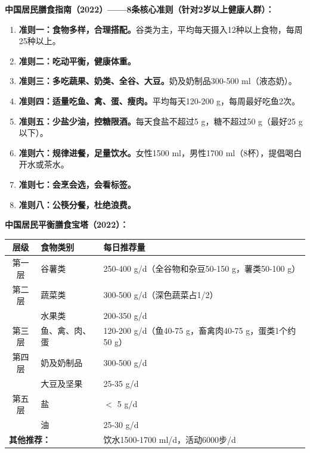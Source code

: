 \begin{keybox}
\textbf{中国居民膳食指南（2022）——8条核心准则（针对2岁以上健康人群）：}

\begin{enumerate}[leftmargin=*]
    \item \textbf{准则一：食物多样，合理搭配。}谷类为主，平均每天摄入12种以上食物，每周25种以上。
    \item \textbf{准则二：吃动平衡，健康体重。}
    \item \textbf{准则三：多吃蔬果、奶类、全谷、大豆。}奶及奶制品300-500 ml（液态奶）。
    \item \textbf{准则四：适量吃鱼、禽、蛋、瘦肉。}平均每天120-200 g，每周最好吃鱼2次。
    \item \textbf{准则五：少盐少油，控糖限酒。}每天食盐不超过5 g，糖不超过50 g（最好25 g以下）。
    \item \textbf{准则六：规律进餐，足量饮水。}女性1500 ml，男性1700 ml（8杯），提倡喝白开水或茶水。
    \item \textbf{准则七：会烹会选，会看标签。}
    \item \textbf{准则八：公筷分餐，杜绝浪费。}
\end{enumerate}
\end{keybox}

\begin{keybox}
\textbf{中国居民平衡膳食宝塔（2022）：}

\begin{table}[H]
\centering
\begin{tabularx}{\textwidth}{clX}
\toprule
\textbf{层级} & \textbf{食物类别} & \textbf{每日推荐量} \\
\midrule
第一层 & 谷薯类 & 250-400 g/d（全谷物和杂豆50-150 g，薯类50-100 g） \\
\midrule
第二层 & 蔬菜类 & 300-500 g/d（深色蔬菜占1/2） \\
       & 水果类 & 200-350 g/d \\
\midrule
第三层 & 鱼、禽、肉、蛋 & 120-200 g/d（鱼40-75 g，畜禽肉40-75 g，蛋类1个约50 g） \\
\midrule
第四层 & 奶及奶制品 & 300-500 g/d \\
       & 大豆及坚果 & 25-35 g/d \\
\midrule
第五层 & 盐 & $<$ 5 g/d \\
       & 油 & 25-30 g/d \\
\midrule
\multicolumn{2}{l}{\textbf{其他推荐：}} & 饮水1500-1700 ml/d，活动6000步/d \\
\bottomrule
\end{tabularx}
\end{table}
\end{keybox}

